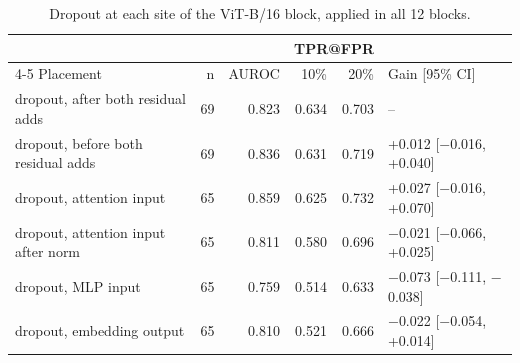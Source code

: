 \begin{table}[htbp]
\centering
\small
\caption{Dropout at each site of the ViT-B/16 block, applied in all 12 blocks.}
\label{tab:staircase-dropout-sites}
\begin{tabular}{lrrrrl}
\toprule
 & & & \multicolumn{2}{c}{TPR@FPR} & \\
\cmidrule(lr){4-5}
Placement & n & AUROC & 10\% & 20\% & Gain [95\% CI] \\
\midrule
dropout, after both residual adds & 69 & 0.823 & 0.634 & 0.703 & -- \\
dropout, before both residual adds & 69 & 0.836 & 0.631 & 0.719 & +0.012 [$-$0.016, +0.040] \\
dropout, attention input & 65 & 0.859 & 0.625 & 0.732 & +0.027 [$-$0.016, +0.070] \\
dropout, attention input after norm & 65 & 0.811 & 0.580 & 0.696 & $-$0.021 [$-$0.066, +0.025] \\
dropout, MLP input & 65 & 0.759 & 0.514 & 0.633 & $-$0.073 [$-$0.111, $-$0.038] \\
dropout, embedding output & 65 & 0.810 & 0.521 & 0.666 & $-$0.022 [$-$0.054, +0.014] \\
\bottomrule
\end{tabular}
\end{table}
